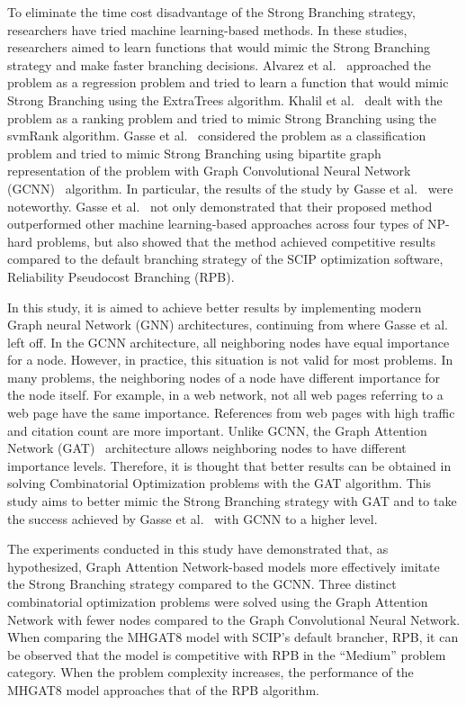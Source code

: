To eliminate the time cost disadvantage of the Strong Branching strategy, researchers have tried machine learning-based methods.
In these studies, researchers aimed to learn functions that would mimic the Strong Branching strategy and make faster branching decisions.
Alvarez et al.~\cite{alvarezMachineLearningBasedApproximation2017} approached the problem as a regression problem and tried to learn a function that would mimic Strong Branching using the ExtraTrees algorithm.
Khalil et al.~\cite{khalilLearningBranchMixed2016} dealt with the problem as a ranking problem and tried to mimic Strong Branching using the svmRank algorithm.
Gasse et al.~\cite{gasseExactCombinatorialOptimization2019} considered the problem as a classification problem and tried to mimic Strong Branching using bipartite graph representation of the problem with Graph Convolutional Neural Network (GCNN)~\cite{kipfSemiSupervisedClassificationGraph2017} algorithm.
In particular, the results of the study by Gasse et al.~\cite{gasseExactCombinatorialOptimization2019} were noteworthy.
Gasse et al.~\cite{gasseExactCombinatorialOptimization2019} not only demonstrated that their proposed method outperformed other machine learning-based approaches across four types of NP-hard problems, but also showed that the method achieved competitive results compared to the default branching strategy of the SCIP optimization software, Reliability Pseudocost Branching (RPB).

In this study, it is aimed to achieve better results by implementing modern Graph neural Network (GNN) architectures, continuing from where Gasse et al.~\cite{gasseExactCombinatorialOptimization2019} left off.
In the GCNN architecture, all neighboring nodes have equal importance for a node.
However, in practice, this situation is not valid for most problems.
In many problems, the neighboring nodes of a node have different importance for the node itself.
For example, in a web network, not all web pages referring to a web page have the same importance.
References from web pages with high traffic and citation count are more important.
Unlike GCNN, the Graph Attention Network (GAT)~\cite{velickovicGraphAttentionNetworks2018} architecture allows neighboring nodes to have different importance levels.
Therefore, it is thought that better results can be obtained in solving Combinatorial Optimization problems with the GAT algorithm.
This study aims to better mimic the Strong Branching strategy with GAT and to take the success achieved by Gasse et al.~\cite{gasseExactCombinatorialOptimization2019} with GCNN to a higher level.

The experiments conducted in this study have demonstrated that, as hypothesized, Graph Attention Network-based models more effectively imitate the Strong Branching strategy compared to the GCNN.
Three distinct combinatorial optimization problems were solved using the Graph Attention Network with fewer nodes compared to the Graph Convolutional Neural Network.
When comparing the MHGAT8 model with SCIP’s default brancher, RPB, it can be observed that the model is competitive with RPB in the “Medium” problem category.
When the problem complexity increases, the performance of the MHGAT8 model approaches that of the RPB algorithm.